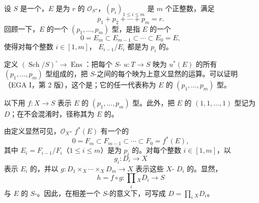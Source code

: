 设 $S$ 是一个，$E$ 是为 $r$ 的 $\mathscr O_S$-，$(p_i)_{1\le i\le m}$ 是 $m$ 个正整数，满足
\[
 p_1+p_2+\cdots+p_m=r.
\]
回顾一下，$E$ 的一个 $(p_1,\ldots,p_m)$ 型，是指 $E$ 的一个
\[
 0=E_m\subset E_{m-1}\subset\cdots\subset E_0=E,
\]
使得对每个整数 $i\in[1,m]$， $E_{i-1}/E_i$ 都是为 $p_i$ 的。

定义 $(\operatorname{Sch}/S)^\circ\to\operatorname{Ens}$：把每个 $S$- $u:T\to S$ 映为 $u^*(E)$ 的所有 $(p_1,\ldots,p_m)$ 型组成的，把 $S$-之间的每个映为上意义显然的运算。可以证明（EGA I，第 2 版），这个是；它的任一代表称为 $E$ 的 $(p_1,\ldots,p_m)$ 型。

以下用 $f:X\to S$ 表示 $E$ 的 $(p_1,\ldots,p_m)$ 型。此外，把 $E$ 的 $(1,1,\ldots,1)$ 型记为 $D$；在不会混淆时，径称其为 $E$ 的。

由定义显然可见，$\mathscr O_X$- $f^*(E)$ 有一个的
\[
 0=F_m\subset F_{m-1}\subset\cdots\subset F_0=f^*(E),
\]
其中 $E_i=F_{i-1}/F_i$（$1\le i\le m$）是为 $p_i$ 的。对每个整数 $i\in[1,m]$，以
\[
 g_i:D_i\longrightarrow X
\]
表示 $E_i$ 的，并以 $g:D_1\times_X\cdots\times_XD_m\to X$ 表示这些 $X$- $D_i$ 的。显然，
\[
 h=f\circ g:\prod_i{}_{\!X}D_i\longrightarrow S\tag{5.1}
\]
与 $E$ 的 $S$-。因此，在相差一个 $S$-的意义下，可写成 $D=\prod_i{}_{\!X}D_i$。

